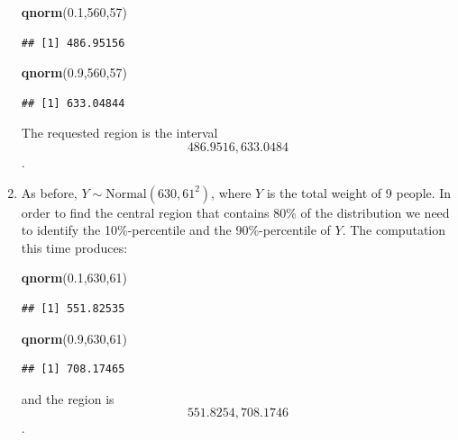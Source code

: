 \documentclass[]{krantz}
\makeatletter
\newenvironment{Shaded}{\begin{snugshade}}{\end{snugshade}}
\newcommand{\KeywordTok}[1]{\textcolor[rgb]{0.13,0.29,0.53}{\textbf{#1}}}
\newcommand{\DecValTok}[1]{\textcolor[rgb]{0.00,0.00,0.81}{#1}}
\newcommand{\FloatTok}[1]{\textcolor[rgb]{0.00,0.00,0.81}{#1}}
\newcommand{\NormalTok}[1]{#1}
\newenvironment{kframe}{%
\medskip{}
\setlength{\fboxsep}{.8em}
 \def\at@end@of@kframe{}%
 \ifinner\ifhmode%
  \def\at@end@of@kframe{\end{minipage}}%
  \begin{minipage}{\columnwidth}%
 \fi\fi%
 \def\FrameCommand##1{\hskip\@totalleftmargin \hskip-\fboxsep
 \colorbox{shadecolor}{##1}\hskip-\fboxsep
     \hskip-\linewidth \hskip-\@totalleftmargin \hskip\columnwidth}%
 \MakeFramed {\advance\hsize-\width
   \@totalleftmargin\z@ \linewidth\hsize
   \@setminipage}}%
 {\par\unskip\endMakeFramed%
 \at@end@of@kframe}
\renewenvironment{Shaded}{\begin{kframe}}{\end{kframe}}
\theoremstyle{definition}
\theoremstyle{definition}
\theoremstyle{definition}
\theoremstyle{remark}
\makeatother
\begin{document}
\begin{enumerate}
\begin{Shaded}
\begin{Highlighting}[]
\KeywordTok{qnorm}\NormalTok{(}\FloatTok{0.1}\NormalTok{,}\DecValTok{560}\NormalTok{,}\DecValTok{57}\NormalTok{)}
\end{Highlighting}
\end{Shaded}

\begin{verbatim}
## [1] 486.95156
\end{verbatim}

\begin{Shaded}
\begin{Highlighting}[]
\KeywordTok{qnorm}\NormalTok{(}\FloatTok{0.9}\NormalTok{,}\DecValTok{560}\NormalTok{,}\DecValTok{57}\NormalTok{)}
\end{Highlighting}
\end{Shaded}

\begin{verbatim}
## [1] 633.04844
\end{verbatim}

  The requested region is the interval \[486.9516, 633.0484\].
\item
  As before, \(Y \sim \mbox{Normal}(630, 61^2)\), where \(Y\) is the
  total weight of 9 people. In order to find the central region that
  contains 80\% of the distribution we need to identify the
  10\%-percentile and the 90\%-percentile of \(Y\). The computation this
  time produces:

\begin{Shaded}
\begin{Highlighting}[]
\KeywordTok{qnorm}\NormalTok{(}\FloatTok{0.1}\NormalTok{,}\DecValTok{630}\NormalTok{,}\DecValTok{61}\NormalTok{)}
\end{Highlighting}
\end{Shaded}

\begin{verbatim}
## [1] 551.82535
\end{verbatim}

\begin{Shaded}
\begin{Highlighting}[]
\KeywordTok{qnorm}\NormalTok{(}\FloatTok{0.9}\NormalTok{,}\DecValTok{630}\NormalTok{,}\DecValTok{61}\NormalTok{)}
\end{Highlighting}
\end{Shaded}

\begin{verbatim}
## [1] 708.17465
\end{verbatim}

  and the region is \[551.8254, 708.1746\].
\end{enumerate}
\end{document}
